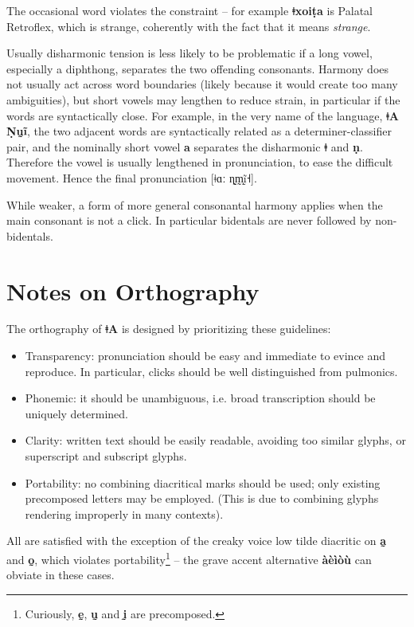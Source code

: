 \documentclass[11pt,a5paper]{book}
\newcommand{\qcn}[1]{\textcolor{AccentText}{\large\textbf{#1}}}
\newcommand{\langname}{\qcn{ǂA}}
\newcommand{\langnamelong}{\qcn{ǂA Ṇṵĩ}}
\begin{document}
The occasional word violates the constraint -- for example \qcn{ǂxoiṭa} is Palatal \textrightarrow{} Retroflex, which is strange, coherently with the fact that it means \emph{strange}. 

Usually disharmonic tension is less likely to be problematic if a long vowel, especially a diphthong, separates the two offending consonants. Harmony does not usually act across word boundaries (likely because it would create too many ambiguities), but short vowels may lengthen to reduce strain, in particular if the words are syntactically close. For example, in the very name of the language, \langnamelong{}, the two adjacent words are syntactically related as a determiner-classifier pair, and the nominally short vowel \qcn{a} separates the disharmonic \qcn{ǂ} and \qcn{ṇ}. Therefore the vowel is usually lengthened in pronunciation, to ease the difficult movement. Hence the final pronunciation [ǂɑː ɳ̰m̩̰ḭ̃˧].

While weaker, a form of more general consonantal harmony applies when the main consonant is not a click. In particular bidentals are never followed by non-bidentals.

\section{Notes on Orthography}

The orthography of \langname{} is designed by prioritizing these guidelines:

\begin{itemize}
	\item Transparency: pronunciation should be easy and immediate to evince and reproduce. In particular, clicks should be well distinguished from pulmonics.
	\item Phonemic: it should be unambiguous, i.e. broad transcrip\-tion should be uniquely determined.
	\item Clarity: written text should be easily readable, avoiding too similar glyphs, or superscript and subscript glyphs.
	\item Portability: no combining diacritical marks should be used; only existing precomposed letters may be employed. (This is due to combining glyphs rendering improperly in many contexts). 
\end{itemize}

All are satisfied with the exception of the creaky voice low tilde diacritic on \qcn{a̰} and \qcn{o̰}, which violates portability\footnote{Curiously, \qcn{ḛ}, \qcn{ṵ} and \qcn{ḭ} are precomposed.} -- the grave accent alternative \qcn{àèìòù} can obviate in these cases.
\end{document}
